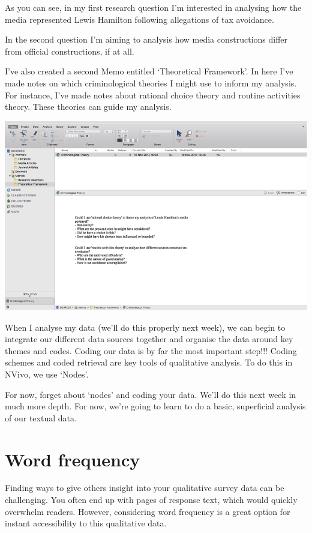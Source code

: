 \documentclass[]{book}
\theoremstyle{definition}
\theoremstyle{definition}
\theoremstyle{definition}
\theoremstyle{remark}
\begin{document}
As you can see, in my first research question I'm interested in
analysing how the media represented Lewis Hamilton following allegations
of tax avoidance.

In the second question I'm aiming to analysis how media constructions
differ from official constructions, if at all.

I've also created a second Memo entitled `Theoretical Framework'. In
here I've made notes on which criminological theories I might use to
inform my analysis. For instance, I've made notes about rational choice
theory and routine activities theory. These theories can guide my
analysis.

\includegraphics{imgs/qual_20.png}

When I analyse my data (we'll do this properly next week), we can begin
to integrate our different data sources together and organise the data
around key themes and codes. Coding our data is by far the most
important step!!! Coding schemes and coded retrieval are key tools of
qualitative analysis. To do this in NVivo, we use `Nodes'.

For now, forget about `nodes' and coding your data. We'll do this next
week in much more depth. For now, we're going to learn to do a basic,
superficial analysis of our textual data.

\hypertarget{word-frequency}{%
\section{Word frequency}\label{word-frequency}}

Finding ways to give others insight into your qualitative survey data
can be challenging. You often end up with pages of response text, which
would quickly overwhelm readers. However, considering word frequency is
a great option for instant accessibility to this qualitative data.
\end{document}
